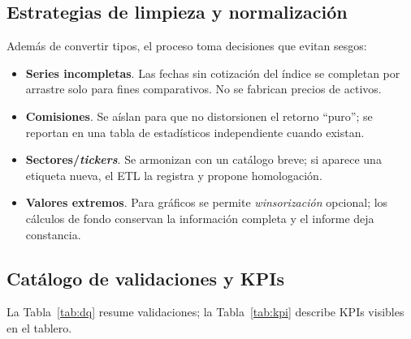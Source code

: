 \documentclass[conference]{IEEEtran}
\begin{document}
\subsection{Estrategias de limpieza y normalización}
Además de convertir tipos, el proceso toma decisiones que evitan sesgos:
\begin{itemize}
  \item \textbf{Series incompletas}. Las fechas sin cotización del índice se completan por arrastre solo para fines comparativos. No se fabrican precios de activos.
  \item \textbf{Comisiones}. Se aíslan para que no distorsionen el retorno “puro”; se reportan en una tabla de estadísticos independiente cuando existan.
  \item \textbf{Sectores/\emph{tickers}}. Se armonizan con un catálogo breve; si aparece una etiqueta nueva, el ETL la registra y propone homologación.
  \item \textbf{Valores extremos}. Para gráficos se permite \emph{winsorización} opcional; los cálculos de fondo conservan la información completa y el informe deja constancia.
\end{itemize}

\subsection{Catálogo de validaciones y KPIs}
La Tabla~\ref{tab:dq} resume validaciones; la Tabla~\ref{tab:kpi} describe KPIs visibles en el tablero.
\begin{table}[!t]
\centering
\caption{Validaciones de calidad (ETL)}
\label{tab:dq}
\vspace{-2mm}
\end{table}
\end{document}
